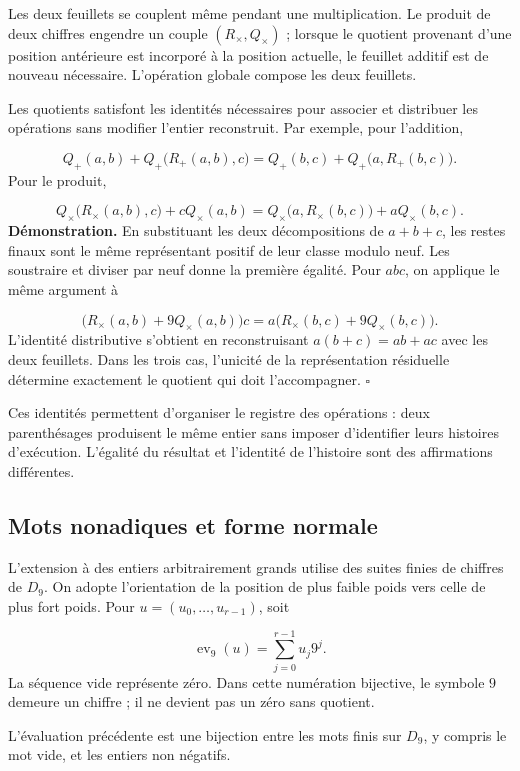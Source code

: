 Les deux feuillets se couplent même pendant une multiplication. Le produit de deux chiffres engendre un couple $(R_\times,Q_\times)$ ; lorsque le quotient provenant d’une position antérieure est incorporé à la position actuelle, le feuillet additif est de nouveau nécessaire. L’opération globale compose les deux feuillets.

Les quotients satisfont les identités nécessaires pour associer et distribuer les opérations sans modifier l'entier reconstruit. Par exemple, pour l'addition,

\[
Q_+(a,b)+Q_+\bigl(R_+(a,b),c\bigr)
=Q_+(b,c)+Q_+\bigl(a,R_+(b,c)\bigr).
\]
Pour le produit,

\[
Q_\times\bigl(R_\times(a,b),c\bigr)+cQ_\times(a,b)
=Q_\times\bigl(a,R_\times(b,c)\bigr)+aQ_\times(b,c).
\]
\textbf{Démonstration.} En substituant les deux décompositions de $a+b+c$, les restes finaux sont le même représentant positif de leur classe modulo neuf. Les soustraire et diviser par neuf donne la première égalité. Pour $abc$, on applique le même argument à

\[
\bigl(R_\times(a,b)+9Q_\times(a,b)\bigr)c
=a\bigl(R_\times(b,c)+9Q_\times(b,c)\bigr).
\]
L'identité distributive s'obtient en reconstruisant $a(b+c)=ab+ac$ avec les deux feuillets. Dans les trois cas, l'unicité de la représentation résiduelle détermine exactement le quotient qui doit l'accompagner. \hfill\(\square\)

Ces identités permettent d'organiser le registre des opérations : deux parenthésages produisent le même entier sans imposer d'identifier leurs histoires d'exécution. L'égalité du résultat et l'identité de l'histoire sont des affirmations différentes.

\subsection{Mots nonadiques et forme normale}
L'extension à des entiers arbitrairement grands utilise des suites finies de chiffres de $D_9$. On adopte l'orientation de la position de plus faible poids vers celle de plus fort poids. Pour $u=(u_0,\ldots,u_{r-1})$, soit

\[
\operatorname{ev}_9(u)=\sum_{j=0}^{r-1}u_j9^j.
\]
La séquence vide représente zéro. Dans cette numération bijective, le symbole $9$ demeure un chiffre ; il ne devient pas un zéro sans quotient.

L'évaluation précédente est une bijection entre les mots finis sur $D_9$, y compris le mot vide, et les entiers non négatifs.

